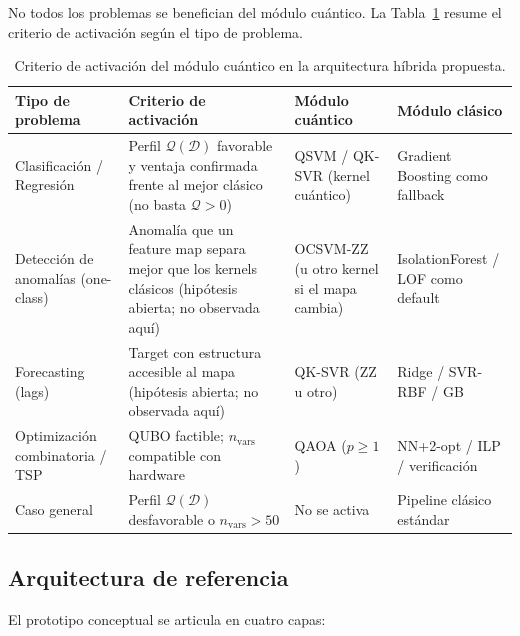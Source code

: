 No todos los problemas se benefician del módulo cuántico. La Tabla~\ref{tab:flujo_hibrido} resume el criterio de activación según el tipo de problema.

\begin{table}[ht]
\centering
\small
\begin{tabular}{>{\raggedright\arraybackslash}p{3.2cm}>{\raggedright\arraybackslash}p{3.2cm}>{\raggedright\arraybackslash}p{3.5cm}>{\raggedright\arraybackslash}p{3.0cm}}
\hline
\textbf{Tipo de problema} & \textbf{Criterio de activación} & \textbf{Módulo cuántico} & \textbf{Módulo clásico} \\
\hline
Clasificación / Regresión &
Perfil $\mathcal{Q}(\mathcal{D})$ favorable y ventaja confirmada frente al mejor clásico (no basta $\mathcal{Q}>0$) &
QSVM / QK-SVR (kernel cuántico) &
Gradient Boosting como fallback \\
\hline
Detección de anomalías (one-class) &
Anomalía que un feature map separa mejor que los kernels clásicos (hipótesis abierta; no observada aquí) &
OCSVM-ZZ (u otro kernel si el mapa cambia) &
IsolationForest / LOF como default \\
\hline
Forecasting (lags) &
Target con estructura accesible al mapa (hipótesis abierta; no observada aquí) &
QK-SVR (ZZ u otro) &
Ridge / SVR-RBF / GB \\
\hline
Optimización combinatoria / TSP &
QUBO factible; $n_{\text{vars}}$ compatible con hardware &
QAOA ($p \geq 1$) &
NN+2-opt / ILP / verificación \\
\hline
Caso general &
Perfil $\mathcal{Q}(\mathcal{D})$ desfavorable o $n_{\text{vars}} > 50$ &
No se activa &
Pipeline clásico estándar \\
\hline
\end{tabular}
\caption{Criterio de activación del módulo cuántico en la arquitectura híbrida propuesta.}
\label{tab:flujo_hibrido}
\end{table}

\subsection{Arquitectura de referencia}

El prototipo conceptual se articula en cuatro capas:

